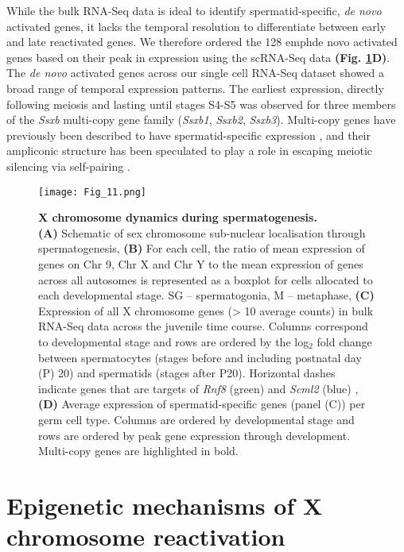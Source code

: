 While the bulk RNA-Seq data is ideal to identify spermatid-specific, \emph{de novo} activated genes, it lacks the temporal resolution to differentiate between early and late reactivated genes. We therefore ordered the 128 emph{de novo} activated genes based on their peak in expression using the scRNA-Seq data \textbf{(Fig. \ref{fig3:X_reactivation}D)}. The \emph{de novo} activated genes across our single cell RNA-Seq dataset showed a broad range of temporal expression patterns. The earliest expression, directly following meiosis and lasting until stages S4-S5 was observed for three members of the \textit{Ssxb} multi-copy gene family (\textit{Ssxb1}, \textit{Ssxb2}, \textit{Ssxb3}). Multi-copy genes have previously been described to have spermatid-specific expression \citep{Mueller2008}, and their ampliconic structure has been speculated to play a role in escaping meiotic silencing via self-pairing \citep{Disteche2008}.

\newpage

\begin{figure}[!h]
\centering
\texttt{[image: Fig\_11.png]}
\caption[X chromosome dynamics during spermatogenesis]{\textbf{X chromosome dynamics during spermatogenesis.} \\
\textbf{(A)} Schematic of sex chromosome sub-nuclear localisation through spermatogenesis, \textbf{(B)} For each cell, the ratio of mean expression of genes on Chr 9, Chr X and Chr Y to the mean expression of genes across all autosomes is represented as a boxplot for cells allocated to each developmental stage. SG – spermatogonia, M – metaphase, \textbf{(C)} Expression of all X chromosome genes (> 10 average counts) in bulk RNA-Seq data across the juvenile time course. Columns correspond to developmental stage and rows are ordered by the log$_2$ fold change between spermatocytes (stages before and including postnatal day (P) 20) and spermatids (stages after P20). Horizontal dashes indicate genes that are targets of \textit{Rnf8} (green) and \textit{Scml2} (blue) \citep{Adams2018}, \textbf{(D)} Average expression of spermatid-specific genes (panel (C)) per germ cell type. Columns are ordered by developmental stage and rows are ordered by peak gene expression through development. Multi-copy genes are highlighted in bold.}
\label{fig3:X_reactivation}
\end{figure}

\newpage

\section{Epigenetic mechanisms of X chromosome reactivation}

